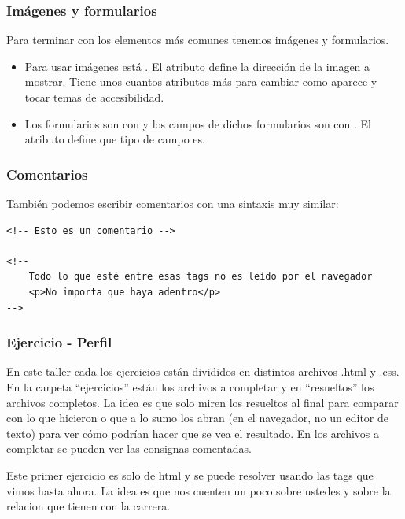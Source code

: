 \begin{frame}[fragile]
    \frametitle{Imágenes y formularios}

    Para terminar con los elementos más comunes tenemos imágenes y formularios.

    \begin{itemize}
        \item Para usar imágenes está . El atributo  define la dirección
              de la imagen a mostrar. Tiene unos cuantos atributos más para cambiar como 
              aparece y tocar temas de accesibilidad.
        \item Los formularios son con  y los campos de dichos formularios 
              son con . El atributo  define que tipo de 
              campo es.
    \end{itemize}

\end{frame}

\begin{frame}[fragile]
    \frametitle{Comentarios}

    También podemos escribir comentarios con una sintaxis muy similar:

\begin{lstlisting}
<!-- Esto es un comentario -->

<!--
    Todo lo que esté entre esas tags no es leído por el navegador
    <p>No importa que haya adentro</p>
-->
\end{lstlisting}

\end{frame}

\begin{frame}
    \frametitle{Ejercicio - Perfil}

    En este taller cada los ejercicios están divididos en distintos archivos .html 
    y .css. En la carpeta ``ejercicios'' están los archivos a completar y en 
    ``resueltos'' los archivos completos. La idea es que solo miren los resueltos 
    al final para comparar con lo que hicieron o que a lo sumo los abran (en el 
    navegador, no un editor de texto) para ver cómo podrían hacer que se vea el 
    resultado. En los archivos a completar se pueden ver las consignas comentadas.

    Este primer ejercicio es solo de html y se puede resolver usando las tags que 
    vimos hasta ahora. La idea es que nos cuenten un poco sobre ustedes y 
    sobre la relacion que tienen con la carrera. 

\end{frame}